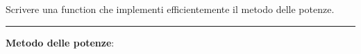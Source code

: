 Scrivere una function che implementi efficientemente il metodo delle potenze.

\hspace*{\fill}
\par\noindent\rule{\textwidth}{0.4pt}
\hspace*{\fill}

\textbf{Metodo delle potenze}:

